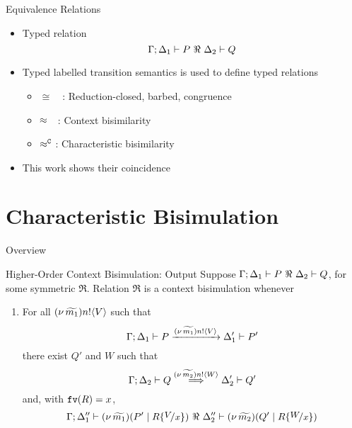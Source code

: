 \documentclass{beamer}
\newcommand{\currentsection}{
	\begin{frame}{Overview}
		\tableofcontents[currentsection]
	\end{frame}
}
\begin{document}
	\begin{frame}{Equivalence Relations}
		\begin{itemize}

			\item	Typed relation
				\[
					\Gamma; \Delta_1 \vdash P\ \Re\ \Delta_2 \vdash Q 
				\]
			\item	Typed labelled transition semantics is used to define typed relations

			\begin{itemize}
				\item	$\cong$\ \ : Reduction-closed, barbed, congruence\\
				\item	$\approx$\ \ : Context bisimilarity\\
				\item	$\approx^\mathtt{C}$ : Characteristic bisimilarity
			\end{itemize}

			\item	This work shows their coincidence


		\end{itemize}
	\end{frame}


	\section{Characteristic Bisimulation}
	\currentsection

	\begin{frame}{Higher-Order Context Bisimulation: Output}
		Suppose $\Gamma; \Delta_1 \vdash P\ \Re\ \Delta_2 \vdash Q$, for some symmetric $\Re$. Relation $\Re$ is
		a context bisimulation whenever
		\begin{enumerate}[$(\star)$]
			\item	For all $(\nu\, \widetilde{m_1}) n ! \langle V \rangle$ such that
				\[
					\Gamma; \Delta_1 \vdash P \xrightarrow{(\nu\, \widetilde{m_1}) n ! \langle V \rangle} \Delta_1' \vdash P'
				\]
				there exist $Q'$ and $W$ such that 
				\[
					\Gamma; \Delta_2 \vdash Q \stackrel{(\nu\, \widetilde{m_2}) n ! \langle W \rangle}{\Longrightarrow} \Delta_2' \vdash Q'
				\]
				and,   with $\mathtt{fv}(R)=x$, 
				\[
					\Gamma; \Delta_1'' \proves \newsp{\widetilde{m_1}}{P' \Par R\subst{V}{x}}\ \Re\ \Delta_2'' \proves \newsp{\widetilde{m_2}}{Q' \Par R\subst{W}{x}}
				\]
		\end{enumerate}
\end{frame}
\end{document}
